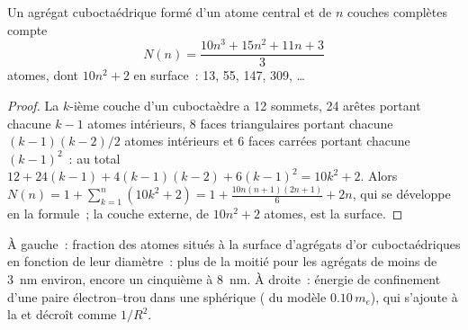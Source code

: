 \begin{proposition}\label{prop:b3:inorganic-materials:magic}
Un agrégat cuboctaédrique formé d'un atome central et de $n$ couches
complètes compte
\[
  N(n) = \frac{10n^3 + 15n^2 + 11n + 3}{3}
\]
atomes, dont $10n^2 + 2$ en surface~: 13, 55, 147, 309, \dots
\end{proposition}

\begin{proof}
La $k$-ième couche d'un cuboctaèdre a 12 sommets, 24 arêtes portant chacune $k - 1$ atomes
intérieurs, 8 faces triangulaires portant chacune $(k - 1)(k - 2)/2$ atomes intérieurs et 6
faces carrées portant chacune $(k - 1)^2$~: au total $12 + 24(k - 1) + 4(k - 1)(k - 2) + 6(k - 1)^2 = 10k^2 + 2$. Alors
$N(n) = 1 + \sum_{k=1}^{n}(10k^2 + 2) = 1 + \frac{10n(n + 1)(2n + 1)}{6} + 2n$, qui se développe en la formule~; la
couche externe, de $10n^2 + 2$ atomes, est la surface.
\end{proof}

\begin{omfigure}

{\small À gauche~: fraction des atomes situés à la surface d'agrégats d'or
cuboctaédriques en fonction de leur diamètre~: plus de la moitié pour les
agrégats de moins de \qty{3}{nm} environ, encore un cinquième à
\qty{8}{nm}. À droite~: énergie de confinement d'une paire électron--trou
dans une  sphérique ( du modèle $0.10\,m_e$),
qui s'ajoute à la  et décroît comme $1/R^2$.}
\end{omfigure}

